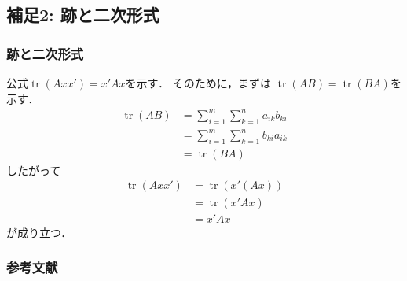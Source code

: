 \documentclass[10pt,hyperref={unicode}]{beamer}
\DeclareMathOperator*{\tr}{tr}
\newcommand{\parentheses}[1]{\left(#1\right)}
\begin{document}
\subsection{補足2: 跡と二次形式}
\label{sec:trace}
\begin{frame}
\frametitle{跡と二次形式}
公式$\tr \parentheses{Axx'} = x'Ax$を示す．
そのために，まずは
$\tr \parentheses{AB} = \tr\parentheses{BA}$を示す．
\begin{align*}
    \tr \parentheses{AB}
    &= \sum_{i = 1}^m \sum_{k = 1}^n a_{ik}b_{ki} \\
    &= \sum_{i = 1}^m \sum_{k = 1}^n b_{ki}a_{ik} \\
    &= \tr \parentheses{BA}
\end{align*}
したがって
\begin{align*}
    \tr \parentheses{Axx'}
    &= \tr \parentheses{x'\parentheses{Ax}} \\
    &= \tr \parentheses{x'Ax} \\
    &= x'Ax
\end{align*}
が成り立つ．
\end{frame}

\begin{frame}
\frametitle{参考文献}


\end{frame}
\end{document}
